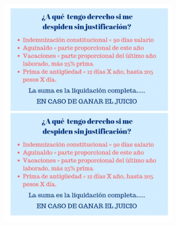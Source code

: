 \begin{figure}[H] %
    \centering
    \includegraphics[width=0.8\textwidth]{Figures/A2_derechosDespido.jpg}
    \label{fig:A2_2}
\end{figure}



